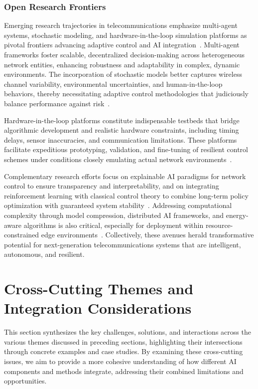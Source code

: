 \documentclass[sigconf]{acmart}
\begin{document}
\subsubsection{Open Research Frontiers}

Emerging research trajectories in telecommunications emphasize multi-agent systems, stochastic modeling, and hardware-in-the-loop simulation platforms as pivotal frontiers advancing adaptive control and AI integration~\cite{ref46}. Multi-agent frameworks foster scalable, decentralized decision-making across heterogeneous network entities, enhancing robustness and adaptability in complex, dynamic environments. The incorporation of stochastic models better captures wireless channel variability, environmental uncertainties, and human-in-the-loop behaviors, thereby necessitating adaptive control methodologies that judiciously balance performance against risk~\cite{ref46}.

Hardware-in-the-loop platforms constitute indispensable testbeds that bridge algorithmic development and realistic hardware constraints, including timing delays, sensor inaccuracies, and communication limitations. These platforms facilitate expeditious prototyping, validation, and fine-tuning of resilient control schemes under conditions closely emulating actual network environments~\cite{ref46}.

Complementary research efforts focus on explainable AI paradigms for network control to ensure transparency and interpretability, and on integrating reinforcement learning with classical control theory to combine long-term policy optimization with guaranteed system stability~\cite{ref50}. Addressing computational complexity through model compression, distributed AI frameworks, and energy-aware algorithms is also critical, especially for deployment within resource-constrained edge environments~\cite{ref49}. Collectively, these avenues herald transformative potential for next-generation telecommunications systems that are intelligent, autonomous, and resilient.

\section{Cross-Cutting Themes and Integration Considerations}

This section synthesizes the key challenges, solutions, and interactions across the various themes discussed in preceding sections, highlighting their intersections through concrete examples and case studies. By examining these cross-cutting issues, we aim to provide a more cohesive understanding of how different AI components and methods integrate, addressing their combined limitations and opportunities.
\end{document}
